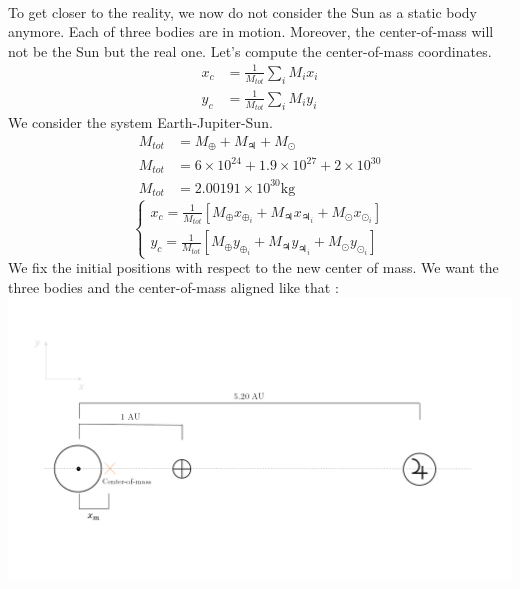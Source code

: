 \documentclass[a4paper, twoside, 11pt]{report}
\theoremstyle{theorem}
\theoremstyle{remark}
\theoremstyle{exemple}
\begin{document}
            \paragraph{}To get closer to the reality, we now do not consider the Sun as a static body anymore. Each of three bodies are in motion. Moreover, the center-of-mass will not be the Sun but the real one. Let's compute the center-of-mass coordinates.
                \begin{align*}
                    x_c &= \frac{1}{M_{tot}}\sum\limits_{i} M_i x_i\\
                    y_c &= \frac{1}{M_{tot}}\sum\limits_{i} M_i y_i
                \end{align*}
            We consider the system Earth-Jupiter-Sun.
                \begin{align*}
                    M_{tot} &= M_{\oplus} + M_{\jupiter} + M_{\odot} \\
                    M_{tot} &= 6\times10^{24} + 1.9\times 10^{27} + 2 \times 10^{30}\\
                    M_{tot} &= 2.00191 \times 10^{30} \mathrm{kg}
                \end{align*}
                \begin{equation*}
                    \left\{
                        \begin{aligned}
                            x_c = \frac{1}{M_{tot}} [M_{\oplus} x_{\oplus_i} + M_{\jupiter} x_{\jupiter_i} + M_{\odot} x_{\odot_i}] \\
                            y_c = \frac{1}{M_{tot}} [M_{\oplus} y_{\oplus_i} + M_{\jupiter} y_{\jupiter_i} + M_{\odot} y_{\odot_i}]
                        \end{aligned}
                    \right.
                \end{equation*} 
            We fix the initial positions with respect to the new center of mass. We want the three bodies and the center-of-mass aligned like that :
            \includegraphics{dessinplanete.png}
\end{document}
